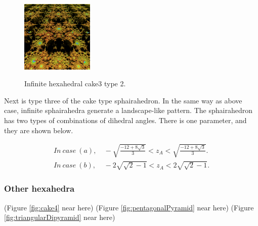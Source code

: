 \documentclass[suppldata, dvipdfmx]{interact}
\theoremstyle{plain}%
\theoremstyle{definition}
\theoremstyle{remark}
\theoremstyle{problemstyle}
\begin{document}
\begin{figure}[H]
\begin{minipage}{0.5\textwidth}
\begin{minipage}[t]{0.24\textwidth}
  \end{minipage}
  \hspace*{\fill}
  \begin{minipage}[t]{0.24\textwidth}
   \centering
   \includegraphics[width=1.35in, height=1.35in,
   keepaspectratio]{./img/sphairahedron/hexahedralCake3/limitsetInf_b.jpg} 
   \label{fig:cake3infiniteLimitsetType2}
  \end{minipage}
  \hspace*{\fill}
  \caption{Infinite hexahedral cake3 type 2.}
  \label{fig:cake3infiniteType2}
 \end{minipage}
\end{figure}

Next is type three of the cake type sphairahedron.
In the same way as above case, infinite sphairahedra generate a landscape-like pattern.
The sphairahedron has two types of combinations of dihedral angles.
There is one parameter, and they are shown below.

\begin{align*}
   In~case~(a),&~-\sqrt{\frac{-12 + 8 \sqrt{3}}{3}} < z_A < \sqrt{\frac{-12 + 8 \sqrt{3}}{3}}.\\
   In~case~(b),&~-2\sqrt{\sqrt{2} - 1} < z_A < 2\sqrt{\sqrt{2} -1}.
\end{align*}


\subsubsection{Other hexahedra}

\noindent(Figure \ref{fig:cake4} near here)
(Figure \ref{fig:pentagonalPyramid} near here)
(Figure \ref{fig:triangularDipyramid} near here)
\end{document}
